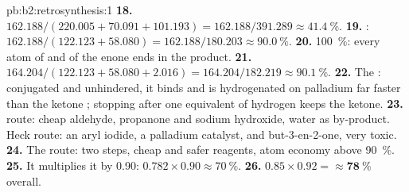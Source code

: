 \begin{solution}{pb:b2:retrosynthesis:1}
\textbf{18.} $162.188/(220.005 + 70.091 + 101.193) = 162.188/391.289 \approx 41.4~\%$.
\textbf{19.} : $162.188/(122.123 + 58.080) = 162.188/180.203
\approx 90.0~\%$.
\textbf{20.} 100~\%: every atom of  and of the enone ends in the product.
\textbf{21.} $164.204/(122.123 + 58.080 + 2.016) = 164.204/182.219 \approx 90.1~\%$.
\textbf{22.} The : conjugated and unhindered, it binds and is hydrogenated on palladium far
faster than the ketone ; stopping after one equivalent of hydrogen keeps the ketone.
\textbf{23.}  route: cheap aldehyde, propanone and sodium hydroxide, water as by-product. Heck
route: an aryl iodide, a palladium catalyst, and but-3-en-2-one, very toxic.
\textbf{24.} The  route: two steps, cheap and safer reagents, atom economy above 90~\%.
\textbf{25.} It multiplies it by 0.90: $0.782 \times 0.90 \approx 70~\%$.
\textbf{26.} $0.85 \times 0.92 = \boldsymbol{\approx 78~\%}$ overall.
\end{solution}
